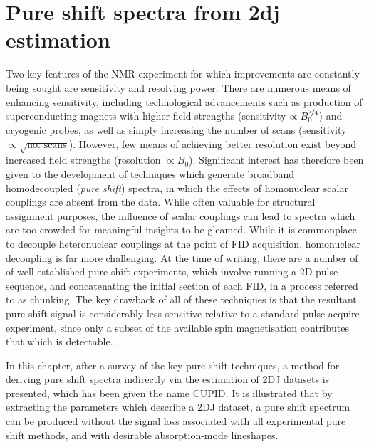 \chapter{Pure shift spectra from 2dj estimation}

Two key features of the \ac{NMR} experiment for which improvements are
constantly being sought are sensitivity and resolving power. There are numerous
means of enhancing sensitivity, including technological advancements such as
production of superconducting magnets with higher field
strengths\cite{Maeda2019} (sensitivity $\propto B_0^{\nicefrac{7}{4}}$) and
cryogenic probes\cite{Styles1984,Styles1989,Kovacs2005}, as well as simply
increasing the number of scans (sensitivity $\propto \sqrt{\text{no. scans}}$).
However, few means of achieving better resolution exist beyond increased field
strengths (resolution $\propto B_0$).  Significant interest has therefore been given to the
development of techniques which generate broadband homodecoupled (\emph{pure
shift}) spectra, in which the effects of homonuclear scalar couplings are
absent from the data. While often valuable for structural assignment purposes,
the influence of scalar couplings can lead to spectra which are too crowded for
meaningful insights to be gleamed. While it is commonplace to decouple
heteronuclear couplings at the point of \ac{FID} acquisition\cite{Shaka1983a,
Shaka1983b,Shaka1985}, homonuclear decoupling is far more challenging. At
the time of writing, there are a number of of well-established pure shift
experiments, which involve running a \ac{2D} pulse sequence, and concatenating
the initial section of each \ac{FID}, in a process referred to as
chunking\cite{Meyer2013,Adams2014,Zangger2015}. The key drawback of all of
these techniques is that the resultant pure shift signal is considerably less sensitive relative to a standard pulse-acquire experiment, since only a subset
 of the available spin magnetisation
contributes that which is detectable.
.

In this chapter, after a survey of the key pure shift techniques, a method for
deriving pure shift spectra indirectly via the estimation of \ac{2DJ} datasets
is presented, which has been given the name \acf{CUPID}. It is illustrated that
by extracting the parameters which describe a \ac{2DJ} dataset, a pure shift
spectrum can be produced without the signal loss associated with all
experimental pure shift methods, and with desirable absorption-mode lineshapes.





